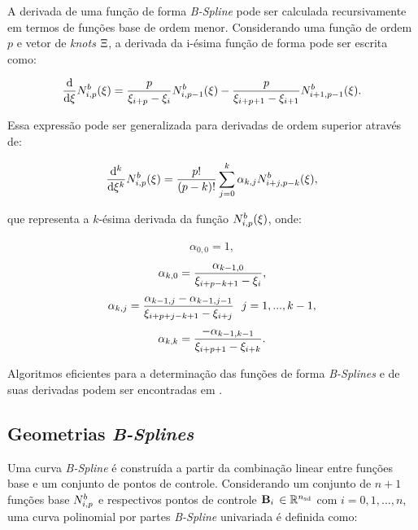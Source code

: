 \documentclass[tese_patricia]{subfiles}
\begin{document}
A derivada de uma função de forma \textit{B-Spline} pode ser calculada recursivamente em termos de funções base de ordem menor. Considerando uma função de ordem $p$ e vetor de \textit{knots} $\Xi$, a derivada da i-ésima função de forma pode ser escrita como:

\begin{align}
\frac{\mathrm{d}}{\mathrm{d} \xi} N^b_{i,p}(\xi) = \frac{p}{\xi_{i+p} - \xi_{i}}N^b_{i,p-1}(\xi) - \frac{p}{\xi_{i+p+1} - \xi_{i+1}}N^b_{i+1,p-1}(\xi).
\end{align}

Essa expressão pode ser generalizada para derivadas de ordem superior através de:

\begin{align}
	\frac{\mathrm{d}^{k}}{\mathrm{d} \xi^{k}} N^b_{i,p}(\xi) = \frac{p!}{\left(p-k\right)!} \sum_{j=0}^{k}{\alpha_{k,j}N^b_{i+j,p-k}(\xi)},
\end{align}

\noindent que representa a $k$-ésima derivada da função $N^b_{i,p}(\xi)$, onde:

\begin{align}
	\alpha_{0,0} = 1,
\end{align}
\begin{align}
	\alpha_{k,0} = \frac{\alpha_{k-1,0}}{\xi_{i+p-k+1}-\xi_{i}},
\end{align}
\begin{align}
	\alpha_{k,j} = \frac{\alpha_{k-1,j}-\alpha_{k-1,j-1}}{\xsi_{i+p+j-k+1}-\xsi_{i+j}} \ \ j=1,...,k-1,
\end{align}
\begin{align}
	\alpha_{k,k} = \frac{-\alpha_{k-1,k-1}}{\xi_{i+p+1}-\xi_{i+k}}.
\end{align}

Algoritmos eficientes para a determinação das funções de forma \textit{B-Splines} e de suas derivadas podem ser encontradas em .

\subsection{Geometrias \textit{B-Splines}}

Uma curva \textit{B-Spline} é construída a partir da combinação linear entre funções base e um conjunto de pontos de controle. Considerando um conjunto de $n+1$ funções base $N^b_{i,p}$ e respectivos pontos de controle $\mathbf{B}_i$ $\in \mathbb{R}^{{n_{\mathrm{sd}}}}$ com $i = 0,1,...,n$, uma curva polinomial por partes \textit{B-Spline} univariada é definida como:
\end{document}
